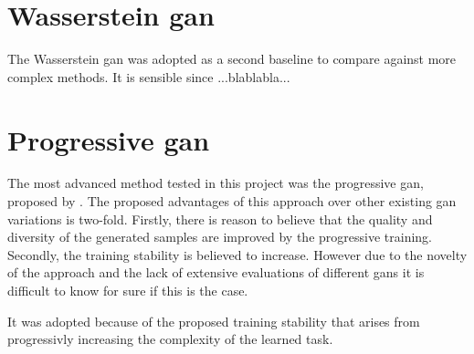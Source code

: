 \section{Wasserstein \acrshort{gan}}
The Wasserstein \acrshort{gan} was adopted as a second baseline to compare against more complex methods. It is sensible since ...blablabla...


\section{Progressive \acrshort{gan}}
The most advanced method tested in this project was the progressive \acrshort{gan}, proposed by \textcite{karras2017progressive}. The proposed advantages of this approach over other existing \acrshort{gan} variations is two-fold. Firstly, there is reason to believe that the quality and diversity of the generated samples are improved by the progressive training. Secondly, the training stability is believed to increase. However due to the novelty of the approach and the lack of extensive evaluations of different \acrshort{gans} it is difficult to know for sure if this is the case.

It was adopted because of the proposed training stability that arises from progressivly increasing the complexity of the learned task. 




